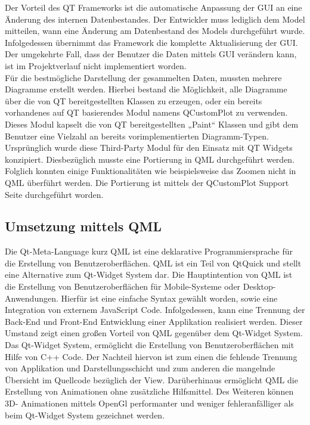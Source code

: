 Der Vorteil des QT Frameworks ist die automatische Anpassung der GUI an eine Änderung des internen Datenbestandes. Der Entwickler muss lediglich dem Model mitteilen, wann eine Änderung am Datenbestand des Models durchgeführt wurde. Infolgedessen übernimmt das Framework die komplette Aktualisierung der GUI. Der umgekehrte Fall, dass der Benutzer die Daten mittels GUI verändern kann, ist im Projektverlauf nicht implementiert worden. \\

Für die bestmögliche Darstellung der gesammelten Daten, mussten mehrere Diagramme erstellt werden. Hierbei bestand die Möglichkeit, alle Diagramme über die von QT bereitgestellten Klassen zu erzeugen, oder ein bereits vorhandenes auf QT basierendes Modul namens QCustomPlot zu verwenden. Dieses Modul kapselt die von QT bereitgestellten „Paint“ Klassen und gibt dem Benutzer eine Vielzahl an bereits vorimplementierten Diagramm-Typen. Ursprünglich wurde diese Third-Party Modul für den Einsatz mit QT Widgets konzipiert. Diesbezüglich musste eine Portierung in QML durchgeführt werden. Folglich konnten einige Funktionalitäten wie beispielsweise das Zoomen nicht in QML überführt werden. Die Portierung ist mittels der QCustomPlot Support Seite durchgeführt worden. \\

\cite{mv} \cite{mvp} \cite{qmlqt} \cite{qmlc} \cite{qplot1} \cite{qplot2} \cite{qtbook}

\subsection{Umsetzung mittels QML}

Die Qt-Meta-Language kurz QML ist eine deklarative Programmiersprache für die Erstellung von Benutzeroberflächen. QML ist ein Teil von QtQuick und stellt eine Alternative zum Qt-Widget System dar. Die Hauptintention von QML ist die Erstellung von Benutzeroberflächen für Mobile-Systeme oder Desktop-Anwendungen. Hierfür ist eine einfache Syntax gewählt worden, sowie eine Integration von externem JavaScript Code. Infolgedessen, kann eine Trennung der Back-End und Front-End Entwicklung einer Applikation realisiert werden. Dieser Umstand zeigt einen großen Vorteil von QML gegenüber dem Qt-Widget System. Das Qt-Widget System, ermöglicht die Erstellung von Benutzeroberflächen mit Hilfe von C++ Code. Der Nachteil hiervon ist zum einen die fehlende Trennung von Applikation und Darstellungsschicht und zum anderen die mangelnde Übersicht im Quellcode bezüglich der View. Darüberhinaus ermöglicht QML die Erstellung von Animationen ohne zusätzliche Hilfsmittel. Des Weiteren können 3D- Animationen mittels OpenGl performanter und weniger fehleranfälliger als beim Qt-Widget System gezeichnet werden. \\

